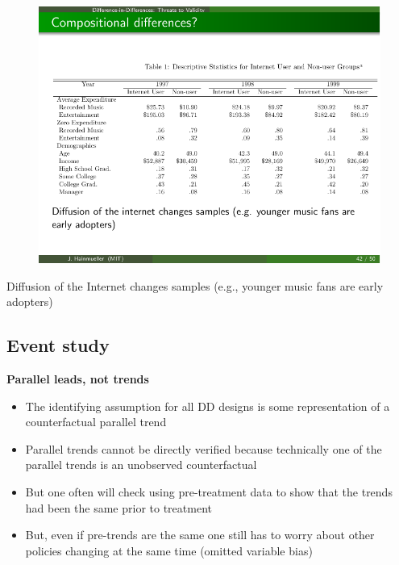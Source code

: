 \documentclass[notes=show]{beamer}
\begin{document}
\begin{frame}[shrink=20,plain]
	\begin{figure}
	\includegraphics{./lecture_includes/Hong_2.pdf}
	\end{figure}
	
	Diffusion of the Internet changes samples (e.g., younger music fans are early adopters)
	
\end{frame}



\subsection{Event study}

\begin{frame}
\begin{center}
\textbf{Parallel leads, not trends}
\end{center}

\begin{itemize}

	\item The identifying assumption for all DD designs is some representation of a counterfactual parallel trend
	\item Parallel trends cannot be directly verified because technically one of the parallel trends is an unobserved counterfactual
	\item But one often will check using pre-treatment data to show that the trends had been the same prior to treatment
	\item But, even if pre-trends are the same one still has to worry about other policies changing at the same time (omitted variable bias)

\end{itemize}

\end{frame}
\end{document}
